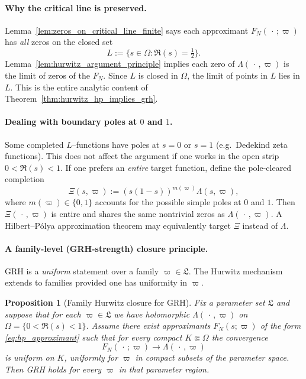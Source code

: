 \documentclass[11pt,oneside]{amsbook}
\numberwithin{equation}{section}
\theoremstyle{plain}
\newtheorem{proposition}[theorem]{Proposition}
\theoremstyle{definition}
\theoremstyle{remark}
\begin{document}
\paragraph{Why the critical line is preserved.}
Lemma~\ref{lem:zeros_on_critical_line_finite} says each approximant $F_N(\,\cdot\,;\varpi)$ has \emph{all} zeros on the closed set
\[
L:=\{s\in\Omega:\Re(s)=\tfrac12\}.
\]
Lemma~\ref{lem:hurwitz_argument_principle} implies each zero of $\Lambda(\,\cdot\,,\varpi)$ is the limit of zeros of the $F_N$.
Since $L$ is closed in $\Omega$, the limit of points in $L$ lies in $L$.
This is the entire analytic content of Theorem~\ref{thm:hurwitz_hp_implies_grh}.

\paragraph{Dealing with boundary poles at $0$ and $1$.}
Some completed $L$--functions have poles at $s=0$ or $s=1$ (e.g.\ Dedekind zeta functions).
This does not affect the argument if one works in the open strip $0<\Re(s)<1$.
If one prefers an \emph{entire} target function, define the pole-cleared completion
\[
\Xi(s,\varpi):=(s(1-s))^{m(\varpi)}\Lambda(s,\varpi),
\]
where $m(\varpi)\in\{0,1\}$ accounts for the possible simple poles at $0$ and $1$.
Then $\Xi(\,\cdot\,,\varpi)$ is entire and shares the same nontrivial zeros as $\Lambda(\,\cdot\,,\varpi)$.
A Hilbert--Pólya approximation theorem may equivalently target $\Xi$ instead of $\Lambda$.

\paragraph{A family-level (GRH-strength) closure principle.}
GRH is a \emph{uniform} statement over a family $\varpi\in\mathfrak{L}$.
The Hurwitz mechanism extends to families provided one has uniformity in $\varpi$.

\begin{proposition}[Family Hurwitz closure for GRH]
\label{prop:family_hurwitz_grh}
Fix a parameter set $\mathfrak{L}$ and suppose that for each $\varpi\in\mathfrak{L}$ we have holomorphic $\Lambda(\,\cdot\,,\varpi)$ on $\Omega=\{0<\Re(s)<1\}$.
Assume there exist approximants $F_N(s;\varpi)$ of the form \eqref{eq:hp_approximant} such that for every compact $K\Subset\Omega$ the convergence
\[
F_N(\,\cdot\,;\varpi)\to \Lambda(\,\cdot\,,\varpi)
\]
is uniform on $K$, \emph{uniformly for $\varpi$ in compact subsets of the parameter space}.
Then GRH holds for every $\varpi$ in that parameter region.
\end{proposition}
\end{document}
